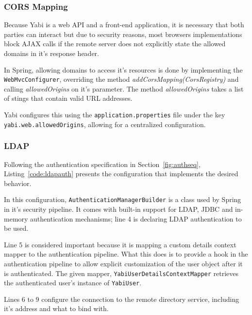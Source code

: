\subsubsection{\gls{CORS} Mapping}

Because \gls{Yabi} is a web \gls{API} and a front-end application, it is necessary that both parties can interact but due to security reasons, most browsers implementations block \gls{AJAX} calls if the remote server does not explicitly state the allowed domains in it's response header.

In Spring, allowing domains to access it's resources is done by implementing the \texttt{WebMvcConfigurer}, overriding the method \textit{addCorsMapping(CorsRegistry)} and calling \textit{allowedOrigins} on it's parameter. The method \textit{allowedOrigins} takes a list of stings that contain valid \gls{URL} addresses.

\gls{Yabi} configures this using the \texttt{application.properties} file under the key \texttt{yabi.web.allowedOrigins}, allowing for a centralized configuration.

\subsubsection{\gls{LDAP}}\label{impl:ldap}

Following the authentication specification in Section~\ref{fig:authseq}, Listing~\ref{code:ldapauth} presents the configuration that implements the desired behavior.



In this configuration, \texttt{AuthenticationManagerBuilder} is a class used by Spring in it's security pipeline. It comes with built-in support for \gls{LDAP}, \gls{JDBC} and in-memory authentication mechanisms; line 4 is declaring \gls{LDAP} authentication to be used.

Line 5 is considered important because it is mapping a custom details context mapper to the authentication pipeline. What this does is to provide a hook in the authentication pipeline to allow explicit customization of the user object after it is authenticated. The given mapper, \texttt{YabiUserDetailsContextMapper} retrieves the authenticated user's instance of \texttt{YabiUser}.

Lines 6 to 9 configure the connection to the remote directory service, including it's address and what to bind with.

